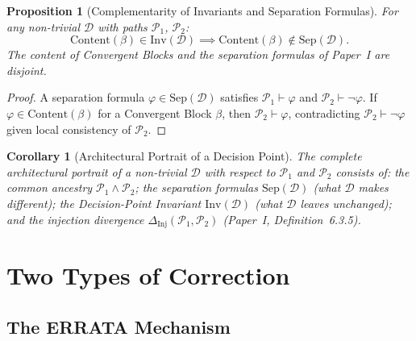 \documentclass[12pt, a4paper]{article}
\theoremstyle{plain}
\newtheorem{proposition}[theorem]{Proposition}
\newtheorem{corollary}[theorem]{Corollary}
\theoremstyle{definition}
\theoremstyle{remark}
\newcommand{\Sep}[1]{\mathrm{Sep}(#1)}
\newcommand{\Inv}[1]{\mathrm{Inv}(#1)}
\begin{document}
\begin{proposition}[Complementarity of Invariants and Separation Formulas]
\label{prop:complement}
For any non-trivial $\mathcal{D}$ with paths $\mathcal{P}_1$,
$\mathcal{P}_2$:
\[
  \mathrm{Content}(\beta) \in \Inv{\mathcal{D}}
  \implies
  \mathrm{Content}(\beta) \notin \Sep{\mathcal{D}}.
\]
The content of Convergent Blocks and the separation formulas of
Paper~I are disjoint.
\end{proposition}

\begin{proof}
A separation formula $\varphi \in \Sep{\mathcal{D}}$ satisfies
$\mathcal{P}_1 \vdash \varphi$ and $\mathcal{P}_2 \vdash \neg\varphi$.
If $\varphi \in \mathrm{Content}(\beta)$ for a Convergent Block
$\beta$, then $\mathcal{P}_2 \vdash \varphi$, contradicting
$\mathcal{P}_2 \vdash \neg\varphi$ given local consistency of
$\mathcal{P}_2$.
\end{proof}

\begin{corollary}[Architectural Portrait of a Decision Point]
\label{cor:portrait}
The complete architectural portrait of a non-trivial $\mathcal{D}$
with respect to $\mathcal{P}_1$ and $\mathcal{P}_2$ consists of:
the common ancestry $\mathcal{P}_1 \wedge \mathcal{P}_2$;
the separation formulas $\Sep{\mathcal{D}}$ (what $\mathcal{D}$
makes different);
the Decision-Point Invariant $\Inv{\mathcal{D}}$ (what $\mathcal{D}$
leaves unchanged);
and the injection divergence $\Delta_{\mathrm{Inj}}(\mathcal{P}_1,
\mathcal{P}_2)$ (Paper~I, Definition~6.3.5).
\end{corollary}

\section{Two Types of Correction}
\label{sec:correction}

\subsection{The ERRATA Mechanism}
\label{subsec:errata}
\end{document}

